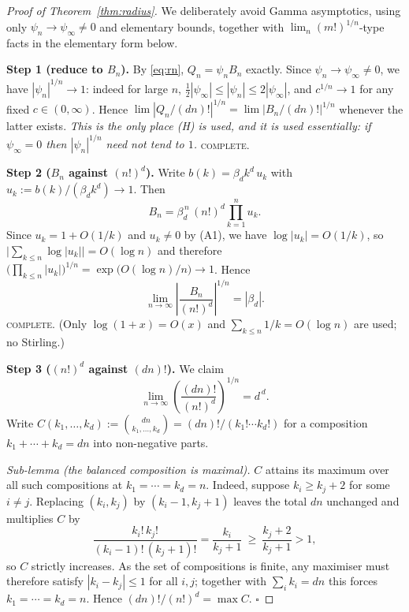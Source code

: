 \documentclass[11pt]{article}
\theoremstyle{definition}
\newcommand{\bd}{\beta_d}
\newcommand{\psiinf}{\psi_\infty}
\begin{document}
\begin{proof}[Proof of Theorem~\ref{thm:radius}]
We deliberately avoid Gamma asymptotics, using only $\psi_n\to\psiinf\neq0$ and
elementary bounds, together with $\lim_{n}(m!)^{1/n}$-type facts in the
elementary form below.

\medskip\noindent\textbf{Step 1 (reduce to $B_n$).}
By \eqref{eq:rn}, $Q_n=\psi_nB_n$ exactly. Since $\psi_n\to\psiinf\neq0$, we have
$|\psi_n|^{1/n}\to1$: indeed for large $n$, $\tfrac12|\psiinf|\le|\psi_n|\le2|\psiinf|$,
and $c^{1/n}\to1$ for any fixed $c\in(0,\infty)$. Hence
$\lim|Q_n/(dn)!|^{1/n}=\lim|B_n/(dn)!|^{1/n}$ whenever the latter exists.
\emph{This is the only place (H) is used, and it is used essentially: if
$\psiinf=0$ then $|\psi_n|^{1/n}$ need not tend to $1$.} \textsc{complete.}

\medskip\noindent\textbf{Step 2 ($B_n$ against $(n!)^d$).}
Write $b(k)=\bd k^d\,u_k$ with $u_k:=b(k)/(\bd k^d)\to1$. Then
\[
B_n=\bd^{\,n}\,(n!)^{d}\prod_{k=1}^{n}u_k .
\]
Since $u_k=1+O(1/k)$ and $u_k\neq0$ by (A1), we have $\log|u_k|=O(1/k)$, so
$\bigl|\sum_{k\le n}\log|u_k|\bigr|=O(\log n)$ and therefore
$\bigl(\prod_{k\le n}|u_k|\bigr)^{1/n}=\exp\bigl(O(\log n)/n\bigr)\to1$.
Hence
\begin{equation}\label{eq:Bnroot}
\lim_{n\to\infty}\left|\frac{B_n}{(n!)^{d}}\right|^{1/n}=|\bd| .
\end{equation}
\textsc{complete.} (Only $\log(1+x)=O(x)$ and $\sum_{k\le n}1/k=O(\log n)$ are
used; no Stirling.)

\medskip\noindent\textbf{Step 3 ($(n!)^d$ against $(dn)!$).}
We claim
\begin{equation}\label{eq:multinomial}
\lim_{n\to\infty}\left(\frac{(dn)!}{(n!)^{d}}\right)^{1/n}=d^{\,d}.
\end{equation}
Write $C(k_1,\dots,k_d):=\binom{dn}{k_1,\dots,k_d}=(dn)!/(k_1!\cdots k_d!)$ for
a composition $k_1+\cdots+k_d=dn$ into non-negative parts.

\emph{Sub-lemma (the balanced composition is maximal).} $C$ attains its maximum
over all such compositions at $k_1=\cdots=k_d=n$. Indeed, suppose
$k_i\ge k_j+2$ for some $i\neq j$. Replacing $(k_i,k_j)$ by $(k_i-1,k_j+1)$
leaves the total $dn$ unchanged and multiplies $C$ by
\[
\frac{k_i!\,k_j!}{(k_i-1)!\,(k_j+1)!}=\frac{k_i}{k_j+1}\ \ge\ \frac{k_j+2}{k_j+1}>1 ,
\]
so $C$ strictly increases. As the set of compositions is finite, any maximiser
must therefore satisfy $|k_i-k_j|\le1$ for all $i,j$; together with
$\sum_ik_i=dn$ this forces $k_1=\cdots=k_d=n$. Hence
$(dn)!/(n!)^d=\max C$. \hfill$\square$


\end{proof}
\end{document}
